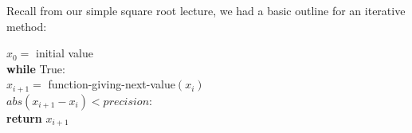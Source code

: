 \documentclass[titlepage]{tufte-book}
\begin{document}
\begin{fullwidth}
\noindent {}

\noindent Recall from our simple square root lecture, we had a basic outline for an iterative method:

$x_0 = $ initial value\\
{\bf while} True:\\
\hspace{4mm}$x_{i+1} = $ function-giving-next-value$(x_i)$\\
\hspace{4mm}{\bf if} $abs(x_{i+1} - x_i) < precision$:\\
{\bf return}  $x_{i+1}$\\


\end{fullwidth}
\end{document}
